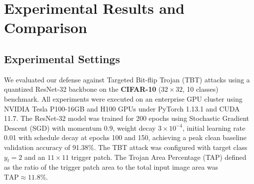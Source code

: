 \documentclass[conference,10pt]{IEEEtran}
\begin{document}
\section{Experimental Results and Comparison}

\subsection{Experimental Settings}
We evaluated our defense against Targeted Bit-flip Trojan (TBT) attacks using a quantized ResNet-32 backbone on the \textbf{CIFAR-10} ($32 \times 32$, 10 classes) benchmark. All experiments were executed on an enterprise GPU cluster using NVIDIA Tesla P100-16GB and H100 GPUs under PyTorch 1.13.1 and CUDA 11.7. 
The ResNet-32 model was trained for 200 epochs using Stochastic Gradient Descent (SGD) with momentum 0.9, weight decay $3 \times 10^{-4}$, initial learning rate 0.01 with schedule decay at epochs 100 and 150, achieving a peak clean baseline validation accuracy of 91.38\%. The TBT attack was configured with target class $y_t = 2$ and an $11 \times 11$ trigger patch. The Trojan Area Percentage (TAP) defined as the ratio of the trigger patch area to the total input image area was $\text{TAP} \approx 11.8\%$.
\end{document}
